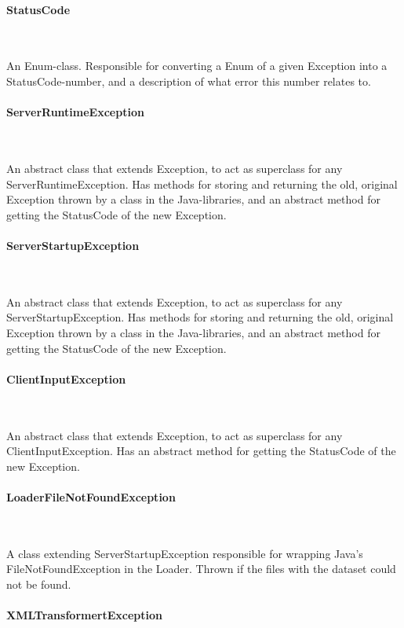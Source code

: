 \documentclass[a4paper,10pt,titlepage]{article}
\begin{document}
				\paragraph{StatusCode}\mbox{}\

An Enum-class. Responsible for converting a Enum of a given Exception into a StatusCode-number, and a description of what error this number relates to.
				
				\paragraph{ServerRuntimeException}\mbox{}\

An abstract class that extends Exception, to act as superclass for any ServerRuntimeException. Has methods for storing and returning the old, original Exception thrown by a class in the Java-libraries, and an abstract method for getting the StatusCode of the new Exception.
				
				\paragraph{ServerStartupException}\mbox{}\

An abstract class that extends Exception, to act as superclass for any ServerStartupException. Has methods for storing and returning the old, original Exception thrown by a class in the Java-libraries, and an abstract method for getting the StatusCode of the new Exception.

				\paragraph{ClientInputException}\mbox{}\

An abstract class that extends Exception, to act as superclass for any ClientInputException. Has an abstract method for getting the StatusCode of the new Exception.

				\paragraph{LoaderFileNotFoundException}\mbox{}\

A class extending ServerStartupException responsible for wrapping Java's FileNotFoundException in the Loader. Thrown if the files with the dataset could not be found.

				\paragraph{XMLTransformertException}\mbox{}\
\end{document}
